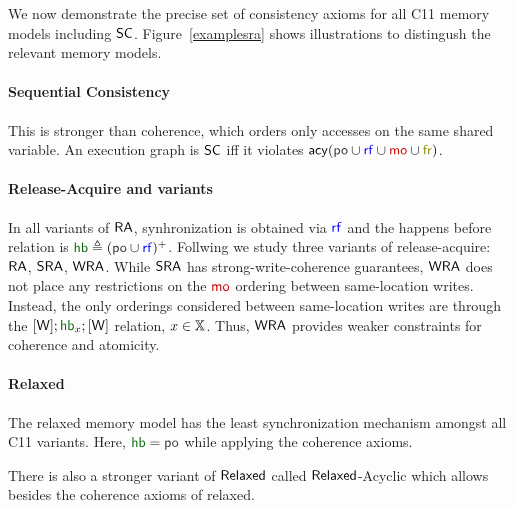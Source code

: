 We now demonstrate the precise set of consistency axioms for all C11 memory models including $\mathsf{SC}$. Figure~\ref{examplesra} shows illustrations to distingush the relevant memory models.

\paragraph*{Sequential Consistency} This is stronger than coherence, which orders only
accesses on the same shared variable. An execution graph is $\mathsf{SC}$ iff it violates $\acy(\po\cup\rf\cup\mo\cup\fr)$.       

\paragraph*{Release-Acquire and variants} In all variants of $\mathsf{RA}$, synhronization is obtained via $\rf$ and the happens before relation is $\hb \triangleq (\po\cup \rf)^+$. Follwing \cite{Lahav2021} we study three variants of release-acquire: $\mathsf{RA}$, $\mathsf{SRA}$, $\mathsf{WRA}$. While $\mathsf{SRA}$ has strong-write-coherence guarantees, $\mathsf{WRA}$ does not place any restrictions on the $\mo$ ordering between same-location writes. Instead, the only orderings considered between same-location writes are through the $[\W];\hb_{x};[\W]$ relation, $x\in{\mathbb X}$. Thus, $\mathsf{WRA}$ provides weaker constraints for coherence and atomicity.

\paragraph*{Relaxed} The relaxed memory model has the least synchronization mechanism amongst all C11 variants. Here, $\hb = \po$ while applying the coherence axioms.

There is also a stronger variant of $\mathsf{Relaxed}$ called $\mathsf{Relaxed}$-Acyclic which allows \PORF{} besides the coherence axioms of relaxed.  

